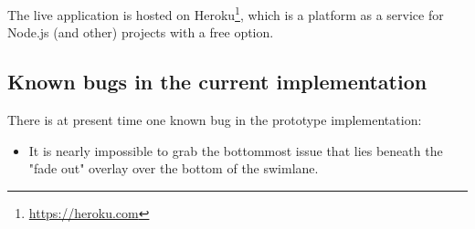 The live application is hosted on Heroku\footnote{\url{https://heroku.com}}, which is a platform as a service for Node.js (and other) projects with a free option.

\subsection{Known bugs in the current implementation}

There is at present time one known bug in the prototype implementation:

\begin{itemize}
  \item It is nearly impossible to grab the bottommost issue that lies beneath the "fade out" overlay over the bottom of the swimlane.
\end{itemize}
